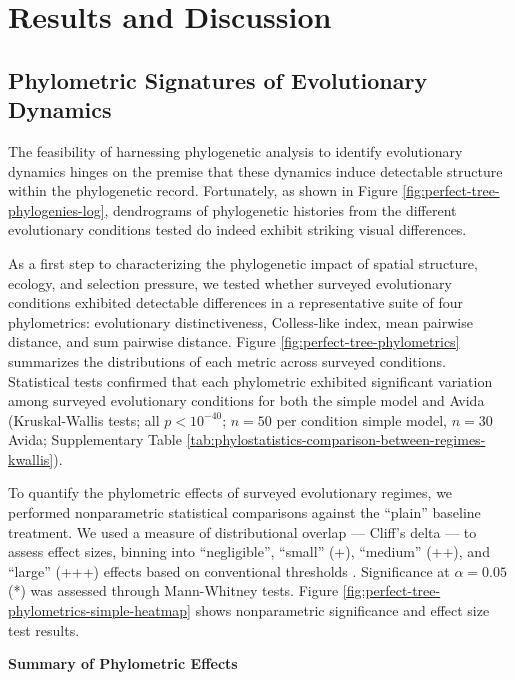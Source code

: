 \section{Results and Discussion}
\label{sec:results}

\subsection{Phylometric Signatures of Evolutionary Dynamics}




The feasibility of harnessing phylogenetic analysis to identify evolutionary dynamics hinges on the premise that these dynamics induce detectable structure within the phylogenetic record.
Fortunately, as shown in Figure \ref{fig:perfect-tree-phylogenies-log}, dendrograms of phylogenetic histories from the different evolutionary conditions tested do indeed exhibit striking visual differences.

As a first step to characterizing the phylogenetic impact of spatial structure, ecology, and selection pressure, we tested whether surveyed evolutionary conditions exhibited detectable differences in a representative suite of four phylometrics: evolutionary distinctiveness, Colless-like index, mean pairwise distance, and sum pairwise distance.
Figure \ref{fig:perfect-tree-phylometrics} summarizes the distributions of each metric across surveyed conditions.
Statistical tests confirmed that each phylometric exhibited significant variation among surveyed evolutionary conditions for both the simple model and Avida (Kruskal-Wallis tests; all $p < 10^{-40}$; $n=50$ per condition simple model, $n=30$ Avida; Supplementary Table \ref{tab:phylostatistics-comparison-between-regimes-kwallis}).

To quantify the phylometric effects of surveyed evolutionary regimes, we performed nonparametric statistical comparisons against the ``plain'' baseline treatment.
We used a measure of distributional overlap --- Cliff's delta --- to assess effect sizes, binning into ``negligible'', ``small'' (+), ``medium'' (++), and ``large'' (+++) effects based on conventional thresholds \citep{hess2004robust}.
Significance at $\alpha = 0.05$ (*) was assessed through Mann-Whitney tests.
Figure \ref{fig:perfect-tree-phylometrics-simple-heatmap} shows nonparametric significance and effect size test results.

\textbf{Summary of Phylometric Effects}

